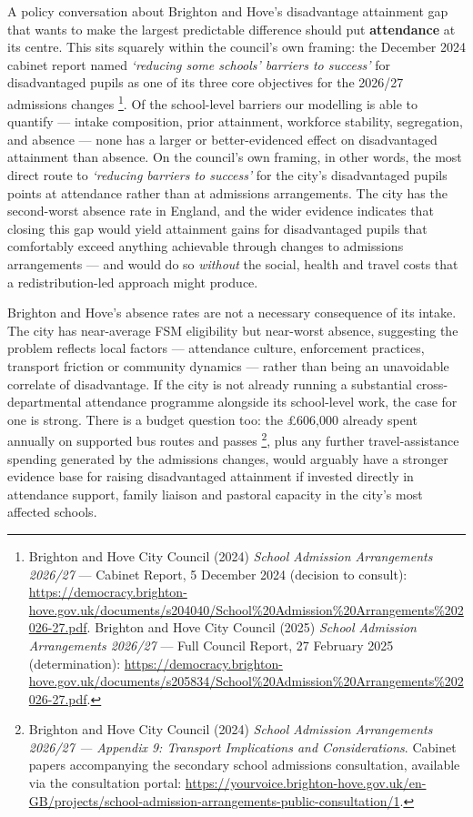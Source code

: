 \documentclass[
  12pt,
  titlepage]{article}
\begin{document}
A policy conversation about Brighton and Hove's disadvantage attainment
gap that wants to make the largest predictable difference should put
\textbf{attendance} at its centre. This sits squarely within the
council's own framing: the December 2024 cabinet report named
\emph{`reducing some schools' barriers to success'} for disadvantaged
pupils as one of its three core objectives for the 2026/27 admissions
changes \footnote{Brighton and Hove City Council (2024) \emph{School
  Admission Arrangements 2026/27} --- Cabinet Report, 5 December 2024
  (decision to consult):
  \url{https://democracy.brighton-hove.gov.uk/documents/s204040/School\%20Admission\%20Arrangements\%202026-27.pdf}.
  Brighton and Hove City Council (2025) \emph{School Admission
  Arrangements 2026/27} --- Full Council Report, 27 February 2025
  (determination):
  \url{https://democracy.brighton-hove.gov.uk/documents/s205834/School\%20Admission\%20Arrangements\%202026-27.pdf}.}.
Of the school-level barriers our modelling is able to quantify ---
intake composition, prior attainment, workforce stability, segregation,
and absence --- none has a larger or better-evidenced effect on
disadvantaged attainment than absence. On the council's own framing, in
other words, the most direct route to \emph{`reducing barriers to
success'} for the city's disadvantaged pupils points at attendance
rather than at admissions arrangements. The city has the second-worst
absence rate in England, and the wider evidence indicates that closing
this gap would yield attainment gains for disadvantaged pupils that
comfortably exceed anything achievable through changes to admissions
arrangements --- and would do so \emph{without} the social, health and
travel costs that a redistribution-led approach might produce.

Brighton and Hove's absence rates are not a necessary consequence of its
intake. The city has near-average FSM eligibility but near-worst
absence, suggesting the problem reflects local factors --- attendance
culture, enforcement practices, transport friction or community dynamics
--- rather than being an unavoidable correlate of disadvantage. If the
city is not already running a substantial cross-departmental attendance
programme alongside its school-level work, the case for one is strong.
There is a budget question too: the £606,000 already spent annually on
supported bus routes and passes \footnote{Brighton and Hove City Council
  (2024) \emph{School Admission Arrangements 2026/27 --- Appendix 9:
  Transport Implications and Considerations}. Cabinet papers
  accompanying the secondary school admissions consultation, available
  via the consultation portal:
  \url{https://yourvoice.brighton-hove.gov.uk/en-GB/projects/school-admission-arrangements-public-consultation/1}.},
plus any further travel-assistance spending generated by the admissions
changes, would arguably have a stronger evidence base for raising
disadvantaged attainment if invested directly in attendance support,
family liaison and pastoral capacity in the city's most affected
schools.
\end{document}
